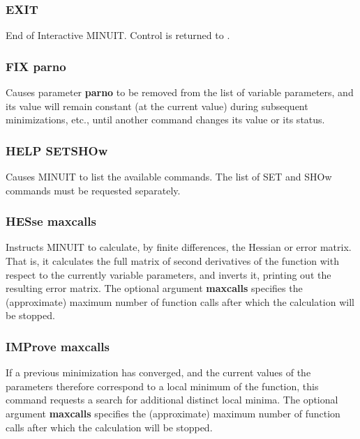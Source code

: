\subsubsection*{EXIT}
\par
End of Interactive MINUIT. Control is returned to \PAW.
\subsubsection*{FIX  parno}
\par
Causes parameter {\bf parno} to be removed from the list of variable
parameters, and its value will remain constant (at the current value)
during subsequent minimizations, etc., until another command changes
its value or its status.
\subsubsection*{HELP \lsb SET\rsb  \lsb SHOw\rsb }
\par
Causes MINUIT to list the available commands. The list of
SET and SHOw commands must be requested separately.
\subsubsection*{HESse  \lsb maxcalls\rsb }
\par
Instructs MINUIT to calculate, by finite differences, the Hessian or
error matrix. That is, it calculates the full matrix of second
derivatives of the function with respect to the currently variable
parameters, and inverts it, printing out the resulting error matrix.
The optional argument {\bf \lsb maxcalls\rsb } specifies the (approximate) maximum
number of function calls after which the calculation will be stopped.
\subsubsection*{IMProve  \lsb maxcalls\rsb }
\par
If a previous minimization has converged, and the current values
of the parameters therefore correspond to a local minimum of the function,
this command requests a search for additional distinct local minima.
The optional argument {\bf \lsb maxcalls\rsb } specifies the (approximate) maximum
number of function calls after which the calculation will be stopped.
